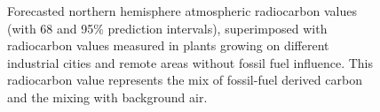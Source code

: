 \documentclass[a4paper, 11pt]{article}
\begin{document}
\begin{figure}[htbp]
   \centering
   \caption{Forecasted northern hemisphere atmospheric radiocarbon values (with 68 and 95\% prediction intervals), superimposed with radiocarbon values measured in plants growing on different industrial cities and remote areas without fossil fuel influence. This radiocarbon value represents the mix of fossil-fuel derived carbon and the mixing with background air. }
   \label{fig:Cities}
\end{figure}
\end{document}
